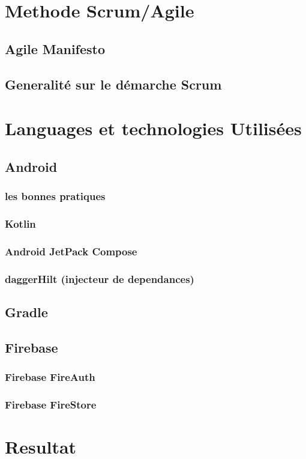\section{Methode Scrum/Agile}
\lipsum[2-2]
\subsection{Agile Manifesto}
\lipsum[2-2]
\subsection{Generalité sur le démarche Scrum}
\lipsum[2-2]
\section{Languages et technologies Utilisées}
\lipsum[2-2]
\subsection{Android}
\lipsum[2-2]
\subsubsection{les bonnes pratiques}
\lipsum[2-2]
\subsubsection{Kotlin}
\lipsum[2-2]
\subsubsection{Android JetPack Compose}
\lipsum[2-2]
\subsubsection{daggerHilt (injecteur de dependances)}
\lipsum[2-2]
\subsection{Gradle}
\lipsum[2-2]
\subsection{Firebase}
\lipsum[2-2]
\subsubsection{Firebase FireAuth}
\lipsum[2-2]
\subsubsection{Firebase FireStore}
\lipsum[2-2]
\section{Resultat}

